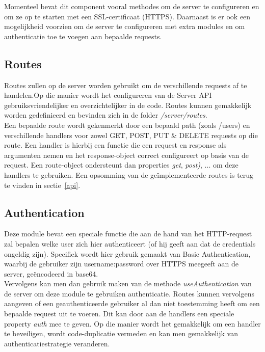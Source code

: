 \documentclass{article}
\begin{document}
Momenteel bevat dit component vooral methodes om de server te configureren en om ze op te starten met een SSL-certificaat (HTTPS). Daarnaast is er ook een mogelijkheid voorzien om de server te configureren met extra modules en om authenticatie toe te voegen aan bepaalde requests.

\subsection{Routes}

Routes zullen op de server worden gebruikt om de verschillende requests af te handelen.Op die manier wordt het configureren van de Server API gebruiksvriendelijker en overzichtelijker in de code. Routes kunnen gemakkelijk worden gedefinieerd en bevinden zich in de folder \textit{/server/routes}.\\

Een bepaalde route wordt gekenmerkt door een bepaald path (zoals /users) en verschillende handlers voor zowel GET, POST, PUT \& DELETE requests op die route. Een handler is hierbij een functie die een request en response als argumenten nemen en het response-object correct configureert op basis van de request. Een route-object ondersteunt dan properties \textit{get}, \textit{post)}, ... om deze handlers te gebruiken. Een opsomming van de ge\"implementeerde routes is terug te vinden in sectie~\ref{api}.

\subsection{Authentication}

Deze module bevat een speciale functie die aan de hand van het HTTP-request zal bepalen welke user zich hier authenticeert (of hij geeft aan dat de credentials ongeldig zijn). Specifiek wordt hier gebruik gemaakt van Basic Authentication, waarbij de gebruiker zijn username:password over HTTPS meegeeft aan de server, ge\"encodeerd in base64.\\

Vervolgens kan men dan gebruik maken van de methode \textit{useAuthentication} van de server om deze module te gebruiken authenticatie. Routes kunnen vervolgens aangeven of een geauthenticeerde gebruiker al dan niet toestemming heeft om een bepaalde request uit te voeren. Dit kan door aan de handlers een speciale property \textit{auth} mee te geven. Op die manier wordt het gemakkelijk om een handler te beveiligen, wordt code-duplicatie vermeden en kan men gemakkelijk van authenticatiestrategie veranderen.
\end{document}
